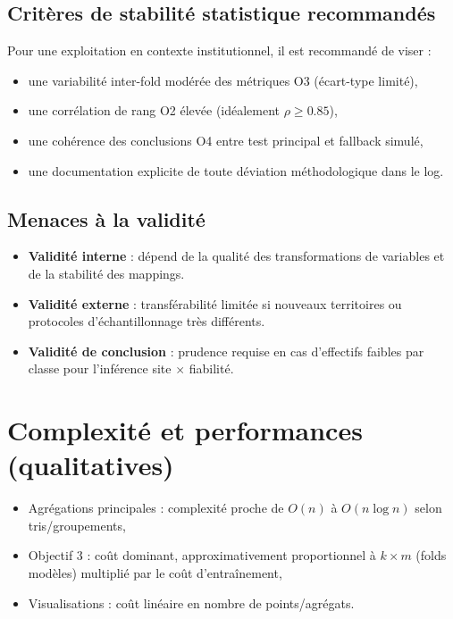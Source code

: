 \documentclass[11pt,a4paper]{article}
\begin{document}
\subsection{Critères de stabilité statistique recommandés}
Pour une exploitation en contexte institutionnel, il est recommandé de viser :
\begin{itemize}[leftmargin=1.2cm]
  \item une variabilité inter-fold modérée des métriques O3 (écart-type limité),
  \item une corrélation de rang O2 élevée (idéalement $\rho \geq 0.85$),
  \item une cohérence des conclusions O4 entre test principal et fallback simulé,
  \item une documentation explicite de toute déviation méthodologique dans le log.
\end{itemize}

\subsection{Menaces à la validité}
\begin{itemize}[leftmargin=1.2cm]
  \item \textbf{Validité interne} : dépend de la qualité des transformations de variables et de la stabilité des mappings.
  \item \textbf{Validité externe} : transférabilité limitée si nouveaux territoires ou protocoles d'échantillonnage très différents.
  \item \textbf{Validité de conclusion} : prudence requise en cas d'effectifs faibles par classe pour l'inférence site $\times$ fiabilité.
\end{itemize}

\section{Complexité et performances (qualitatives)}
\begin{itemize}[leftmargin=1.2cm]
  \item Agrégations principales : complexité proche de $O(n)$ à $O(n\log n)$ selon tris/groupements,
  \item Objectif 3 : coût dominant, approximativement proportionnel à
  \(k \times m\) (folds \texttimes{} modèles) multiplié par le coût d'entraînement,
  \item Visualisations : coût linéaire en nombre de points/agrégats.
\end{itemize}
\end{document}
